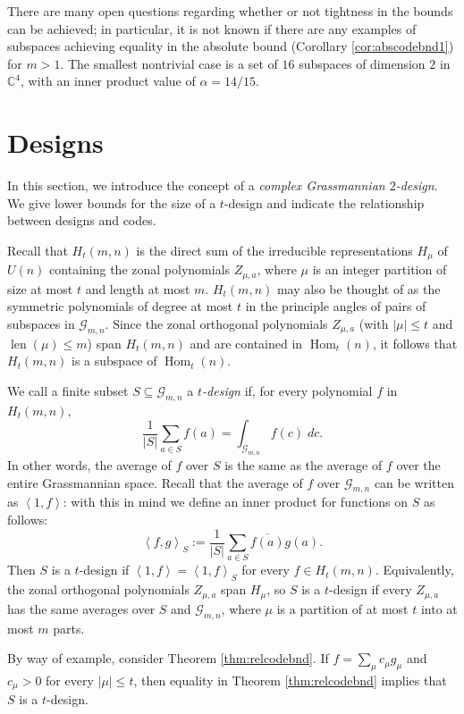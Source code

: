 \documentclass[12pt]{article}
\numberwithin{equation}{section}
\theoremstyle{plainsl}
\newcommand\defn[1]{\textsl{#1}}
\newcommand\al{\alpha}
\newcommand\sbs{\subseteq}
\newcommand\cx{{\mathbb C}}%
\newcommand\gras[2]{\mathcal{G}_{#1,#2}}
\newcommand\ip[2]{\left\langle#1,#2\right\rangle}
\newcommand\abs[1]{\left|#1\right|}
\newcommand\conj[1]{\overline{#1}}
\newcommand\opk[1]{\mathop{\mathrm{#1}}\nolimits}
\newcommand\len{\opk{len}}
\newcommand\Hom{\opk{Hom}}
\begin{document}
There are many open questions regarding whether or not tightness in the bounds can be achieved; in particular, it is not known if there are any examples of subspaces achieving equality in the absolute bound (Corollary \ref{cor:abscodebnd1}) for $m > 1$. The smallest nontrivial case is a set of $16$ subspaces of dimension $2$ in $\cx^4$, with an inner product value of $\al = 14/15$. 

\section{Designs}
\label{sec:designs}

In this section, we introduce the concept of a \defn{complex Grassmannian $2$-design}. We give lower bounds for the size of a $t$-design and indicate the relationship between designs and codes.

Recall that $H_t(m,n)$ is the direct sum of the irreducible representations $H_\mu$ of $U(n)$ containing the zonal polynomials $Z_{\mu,a}$, where $\mu$ is an integer partition of size at most $t$ and length at most $m$. $H_t(m,n)$ may also be thought of as the symmetric polynomials of degree at most $t$ in the principle angles of pairs of subspaces in $\gras{m}{n}$. Since the zonal orthogonal polynomials $Z_{\mu,a}$ (with $\abs{\mu} \leq t$ and $\len(\mu) \leq m$) span $H_t(m,n)$ and are contained in $\Hom_t(n)$, it follows that $H_t(m,n)$ is a subspace of $\Hom_t(n)$. 

We call a finite subset $S \sbs \gras{m}{n}$ a \defn{$t$-design} if, for every polynomial $f$ in $H_t(m,n)$, 
\[
\frac{1}{|S|}\sum_{a \in S} f(a) = \int_{\gras{m}{n}} f(c) \; dc.
\]
In other words, the average of $f$ over $S$ is the same as the average of $f$ over the entire Grassmannian space. Recall that the average of $f$ over $\gras{m}{n}$ can be written as $\ip{1}{f}$: with this in mind we define an inner product for functions on $S$ as follows:
\[
\ip{f}{g}_S := \frac{1}{|S|} \sum_{a \in S} \conj{f(a)}g(a).
\]
Then $S$ is a $t$-design if $\ip{1}{f} = \ip{1}{f}_S$ for every $f \in H_t(m,n)$.
Equivalently, the zonal orthogonal polynomials $Z_{\mu,a}$ span $H_\mu$, so $S$ is a $t$-design if every $Z_{\mu,a}$ has the same averages over $S$ and $\gras{m}{n}$, where $\mu$ is a partition of at most $t$ into at most $m$ parts.

By way of example, consider Theorem \ref{thm:relcodebnd}. If $f = \sum_{\mu}c_{\mu} g_{\mu}$ and $c_{\mu} > 0$ for every $\abs{\mu} \leq t$, then equality in Theorem \ref{thm:relcodebnd} implies that $S$ is a $t$-design. 
\end{document}

